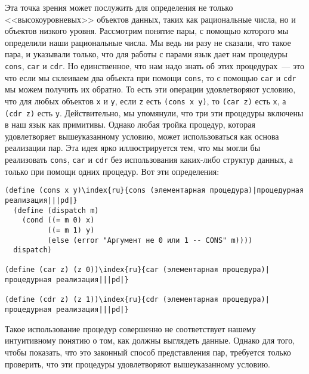 %
%
Эта точка зрения может послужить для определения не только
<<высокоуровневых>> объектов данных, таких как рациональные числа, но
и объектов низкого уровня.  Рассмотрим понятие пары, с помощью которого
мы определили наши рациональные числа.  Мы ведь ни разу
не сказали, что такое пара, и указывали только, что для работы с парами 
язык дает нам процедуры {\tt cons}, {\tt car} и 
{\tt cdr}.  Но единственное, что нам надо
знать об этих процедурах~--- это что если мы  склеиваем два объекта
при помощи {\tt cons}, то с помощью {\tt car} и
{\tt cdr} мы можем получить их обратно.  То есть эти операции
удовлетворяют условию, что для любых объектов {\tt x} и
{\tt y}, если {\tt z} есть {\tt (cons x y)}, то
{\tt (car z)} есть {\tt x}, 
%
%
а {\tt (cdr z)} есть
%
{\tt y}.  Действительно, мы упомянули, что три эти процедуры
включены в наш язык как примитивы.  Однако любая тройка процедур,
которая удовлетворяет вышеуказанному условию, может использоваться как 
основа реализации пар.  Эта идея ярко иллюстрируется тем, что мы могли 
бы реализовать {\tt cons}, {\tt car} и 
{\tt cdr} без использования каких-либо структур данных, а
только при помощи одних процедур.  Вот эти определения:

\begin{Verbatim}[fontsize=\small]
(define (cons x y)\index{ru}{cons (элементарная процедура)|процедурная реализация|||pd|}
  (define (dispatch m)
    (cond ((= m 0) x)
          ((= m 1) y)
          (else (error "Аргумент не 0 или 1 -- CONS" m))))
  dispatch)

(define (car z) (z 0))\index{ru}{car (элементарная процедура)|процедурная реализация|||pd|}

(define (cdr z) (z 1))\index{ru}{cdr (элементарная процедура)|процедурная реализация|||pd|}
\end{Verbatim}
Такое использование процедур совершенно не соответствует нашему
интуитивному понятию о том, как должны выглядеть данные.  Однако для
того, чтобы показать, что это законный способ представления
пар, требуется только проверить, что эти процедуры удовлетворяют вышеуказанному
условию. %

